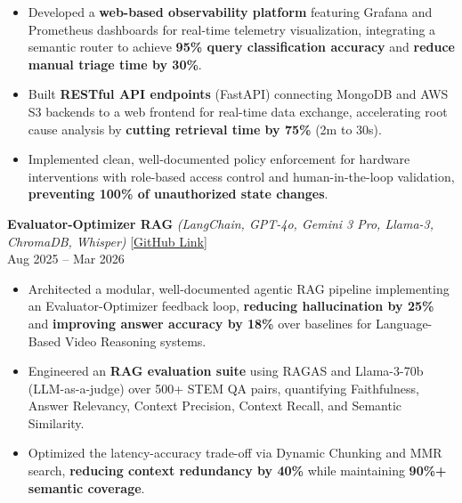 \documentclass[letterpaper,10.5pt]{extarticle}
\begin{document}
\begin{itemize}[leftmargin=12pt, topsep=1pt, itemsep=0pt, parsep=0pt]
    \item Developed a \textbf{web-based observability platform} featuring Grafana and Prometheus dashboards for real-time telemetry visualization, integrating a semantic router to achieve \textbf{95\% query classification accuracy} and \textbf{reduce manual triage time by 30\%}.
    \item Built \textbf{RESTful API endpoints} (FastAPI) connecting MongoDB and AWS S3 backends to a web frontend for real-time data exchange, accelerating root cause analysis by \textbf{cutting retrieval time by 75\%} (2m to 30s).
    \item Implemented clean, well-documented policy enforcement for hardware interventions with role-based access control and human-in-the-loop validation, \textbf{preventing 100\% of unauthorized state changes}.
\end{itemize}

\vspace{4pt}

\noindent\textbf{Evaluator-Optimizer RAG}
\textit{(LangChain, GPT-4o, Gemini 3 Pro, Llama-3, ChromaDB, Whisper)} \hfill \href{https://github.com/slowloris-98/Evaluator-Optimizer-RAG}{[GitHub Link]} \\
Aug 2025 -- Mar 2026

\begin{itemize}[leftmargin=12pt, topsep=1pt, itemsep=0pt, parsep=0pt]
    \item Architected a modular, well-documented agentic RAG pipeline implementing an Evaluator-Optimizer feedback loop, \textbf{reducing hallucination by 25\%} and \textbf{improving answer accuracy by 18\%} over baselines for Language-Based Video Reasoning systems.
    \item Engineered an \textbf{RAG evaluation suite} using RAGAS and Llama-3-70b (LLM-as-a-judge) over 500+ STEM QA pairs, quantifying Faithfulness, Answer Relevancy, Context Precision, Context Recall, and Semantic Similarity.
    \item Optimized the latency-accuracy trade-off via Dynamic Chunking and MMR search, \textbf{reducing context redundancy by 40\%} while maintaining \textbf{90\%+ semantic coverage}.
\end{itemize}
\end{document}
